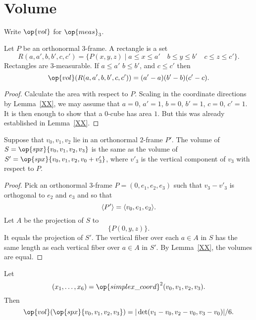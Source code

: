 \section{Volume}

Write $\op{vol}$ for $\op{meas}_3$.

\begin{lemma}
Let $P$ be an orthonormal $3$-frame.  A rectangle is a set
    $$R(a,a',b,b',c,c') = \{ P(x,y,z) \mid a \le x \le a'\quad b\le y\le b'\quad
    c\le z \le c'\}.$$
Rectangles are $3$-measurable. If $a\le a'$  $b\le b'$, and $c\le
c'$ then
    $$\op{vol}(R(a,a',b,b',c,c')) = (a'-a)(b'-b)(c'-c).$$
\end{lemma}

\begin{proof} Calculate the area with respect to $P$.  Scaling in
the coordinate directions by Lemma~\ref{XX}, we may assume that
$a=0$, $a'=1$, $b=0$, $b'=1$, $c=0$, $c'=1$.  It is then enough to
show that a $0$-cube has area $1$.  But this was already established
in Lemma~\ref{XX}.
\end{proof}


\begin{lemma} Suppose that $v_0,v_1,v_2$ lie in an orthonormal $2$-frame $P'$.
The volume of $S=\op{spx}\{v_0,v_1,v_2,v_3\}$ is the same as the
volume of $S'=\op{spx}\{v_0,v_1,v_2,v_0+ v'_3\}$, where $v'_3$ is
the vertical component of $v_3$ with respect to $P$.
\end{lemma}


\begin{proof} Pick an orthonormal $3$-frame $P = (0,e_1,e_2,e_3)$ such that
$v_3 - v'_3$ is orthogonal to $e_2$ and $e_3$ and so that
$${\langle P'\rangle} = {\langle v_0,e_1,e_2\rangle}.$$
Let $A$ be the projection of $S$ to
    $$\{P(0,y,z)\}.$$
It equals the projection of $S'$.  The vertical fiber over each
$a\in A$ in $S$ has the same length as each vertical fiber over
$a\in A$ in $S'$.  By Lemma~\ref{XX}, the volumes are equal.
\end{proof}




\begin{lemma} Let $$(x_1,\ldots,x_6) = \op{simplex\_coord}^2(v_0,v_1,v_2,v_3).$$
Then
    $$\op{vol}(\op{spx}\{v_0,v_1,v_2,v_3\}) =
    |\det(v_1-v_0,v_2-v_0,v_3-v_0)|/6.$$
\end{lemma}

